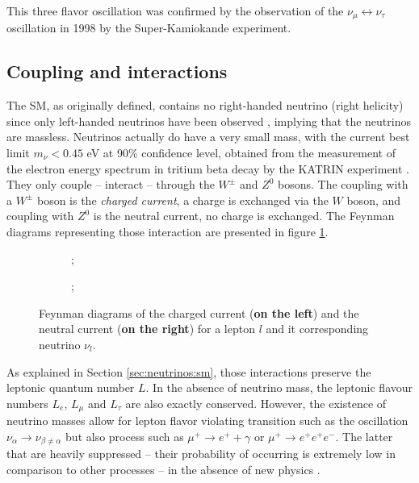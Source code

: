 This three flavor oscillation was confirmed by the observation of the $\nu_\mu \leftrightarrow \nu_\tau$ oscillation \cite{fukuda_evidence_1998} in 1998 by the Super-Kamiokande experiment.

\subsection{Coupling and interactions}

The SM, as originally defined, contains no right-handed neutrino (right helicity) since only left-handed neutrinos have been observed \cite{goldhaber_helicity_1958}, implying that the neutrinos are massless. Neutrinos actually do have a very small mass, with the current best limit $m_\nu < 0.45$ eV at 90\% confidence level, obtained from the measurement of the electron energy spectrum in tritium beta decay by the KATRIN experiment \cite{aker_direct_2024}. They only couple -- interact -- through the $W^{\pm}$ and $Z^0$ bosons. The coupling with a $W^{\pm}$ boson is the \textit{charged current}, a charge is exchanged via the $W$ boson, and coupling with $Z^0$ is the neutral current, no charge is exchanged. The Feynman diagrams representing those interaction are presented in figure \ref{fig:neutrinos:currents}.

\begin{figure}
  \centering
  \begin{subfigure}[t]{0.48\linewidth}
    \centering
    ;
  \end{subfigure}
  \hfill
  \begin{subfigure}[t]{0.48\linewidth}
    \centering
    ;
  \end{subfigure}
  \caption{Feynman diagrams of the charged current (\textbf{on the left}) and the neutral current (\textbf{on the right}) for a lepton $l$ and it corresponding neutrino $\nu_l$.}
  \label{fig:neutrinos:currents}
\end{figure}

As explained in Section \ref{sec:neutrinos:sm}, those interactions preserve the leptonic quantum number $L$. In the absence of neutrino mass, the leptonic flavour numbers $L_e$, $L_\mu$ and $L_\tau$ are also exactly conserved. However, the existence of neutrino masses allow for lepton flavor violating transition such as the oscillation $\nu_\alpha \rightarrow \nu_{\beta \neq \alpha}$ but also process such as $\mu^+ \rightarrow e^+ + \gamma$ or $\mu^+ \rightarrow e^+ e^+ e^-$. The latter that are heavily suppressed -- their probability of occurring is extremely low in comparison to other processes -- in the absence of new physics \cite{glashow_weak_1970}.


